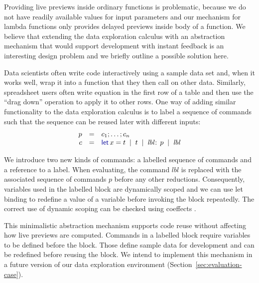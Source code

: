 \documentclass[english,submission]{programming}
\theoremstyle{plain}
\theoremstyle{definition}
\newcommand{\lsep}{\;\;|\;\;}
\newcommand{\kvd}[1]{\textnormal{\textcolor{kvdclr}{\sffamily #1}}}
\begin{document}
Providing live previews inside ordinary functions is problematic, because we do not have readily
available values for input parameters and our mechanism for lambda functions only provides
delayed previews inside body of a function. We believe that extending the data exploration calculus
with an abstraction mechanism that would support development with instant feedback is an
interesting design problem and we briefly outline a possible solution here.

Data scientists often write code interactively using a sample data set and, when it works well,
wrap it into a function that they then call on other data. Similarly, spreadsheet users
often write equation in the first row of a table and then use the ``drag down'' operation to
apply it to other rows. One way of adding similar functionality to the data exploration calculus
is to label a sequence of commands such that the sequence can be reused later with different
inputs:
%
\begin{equation*}
\begin{array}{rcl}
p &=& c_1; \ldots; c_n\\
c &=& \kvd{let}\,x=t \lsep t \lsep \textit{lbl}\!:\,p \lsep \textit{lbl}
\end{array}
\end{equation*}

\noindent
We introduce two new kinds of commands: a labelled sequence of commands and a reference to a label.
When evaluating, the command $\textit{lbl}$ is replaced with the associated sequence of
commands $p$ before any other reductions. Consequently, variables used in the labelled block are
dynamically scoped and we can use let binding to redefine a value of a variable before invoking
the block repeatedly. The correct use of dynamic scoping can be checked using
coeffects \cite{coeffects}.

This minimalistic abstraction mechanism supports code reuse without affecting how live previews
are computed. Commands in a labelled block require variables to be defined before the block.
Those define sample data for development and can be redefined before reusing the block. We
intend to implement this mechanism in a future version of our data
exploration environment (Section~\ref{sec:evaluation-case}).

\end{document}
